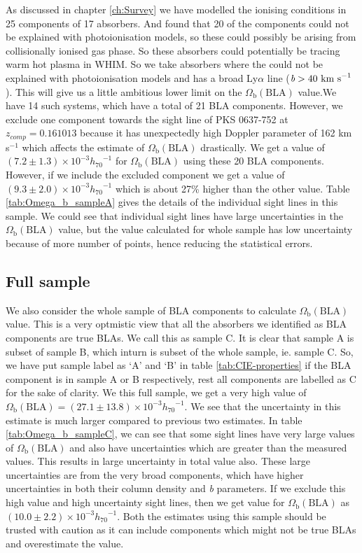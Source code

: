 As discussed in chapter \ref{ch:Survey} we have modelled the ionising conditions in 25 components of 17  absorbers. And found that 20 of the components could not be explained with photoionisation models, so these could possibly be arising from collisionally ionised gas phase. So these absorbers could potentially be tracing warm hot plasma in WHIM. So we take absorbers where the  could not be explained with photoionisation models and has a broad Ly$\alpha$ line ($\emph{b}>40 \ \text{km s}^{-1}$). This will give us a little ambitious lower limit on the $\Omega_\text{b}(\text{BLA})$ value.We have 14 such systems, which have a total of 21 BLA components. However, we exclude one component towards the sight line of PKS 0637-752 at $z_{comp}=0.161013$ because it has unexpectedly high Doppler parameter of 162 km s$^{-1}$ which affects the estimate of $\Omega_\text{b}(\text{BLA})$ drastically. We get a value of  $(7.2 \pm 1.3)\times 10^{-3} {h_{70}}^{-1}$ for $\Omega_\text{b}(\text{BLA})$ using these 20 BLA components. However, if we include the excluded component we get a value of $(9.3 \pm 2.0)\times 10^{-3} {h_{70}}^{-1}$ which is about 27\% higher than the other value. Table \ref{tab:Omega_b_sampleA} gives the details of the individual sight lines in this sample. We could see that individual sight lines have large uncertainties in the $\Omega_\text{b}(\text{BLA})$ value, but the value calculated for whole sample has low uncertainty because of more number of points, hence reducing the statistical errors. 


\subsection{Full sample} \label{sec:sampleC}

We also consider the whole sample of BLA components to calculate $\Omega_\text{b}(\text{BLA})$ value. This is a very optmistic view that all the absorbers we identified as BLA components are true BLAs. We call this as sample C. It is clear that sample A is subset of sample B, which inturn is subset of the whole sample, ie. sample C. So, we have put sample label as `A' and `B' in table \ref{tab:CIE-properties} if the BLA component is in sample A or B respectively, rest all components are labelled as C for the sake of clarity. We this full sample, we get a very high value of $\Omega_\text{b}(\text{BLA}) = (27.1 \pm 13.8)\times 10^{-3} {h_{70}}^{-1}$. We see that the uncertainty in this estimate is much larger compared to previous two estimates. In table \ref{tab:Omega_b_sampleC}, we can see that some sight lines have very large values of $\Omega_\text{b}(\text{BLA})$ and also have uncertainties which are greater than the measured values. This results in large uncertainty in total value also. These large uncertainties are from the very broad components, which have higher uncertainties in both their column density and \emph{b} parameters. If we exclude this high value and high uncertainty sight lines, then we get value for $\Omega_\text{b}(\text{BLA})$ as $(10.0 \pm 2.2)\times 10^{-3} {h_{70}}^{-1}$. Both  the estimates using this sample should be trusted with caution as it can include components which might not be true BLAs and overestimate the value.

